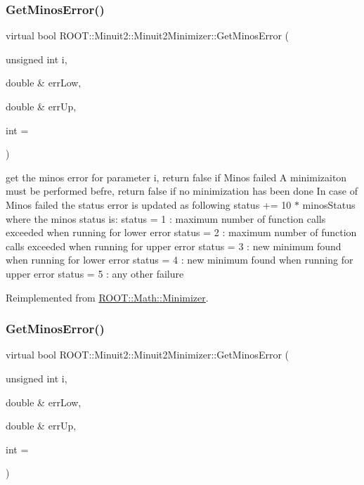 \subsubsection{\texorpdfstring{GetMinosError()}{GetMinosError()}\hspace{0.1cm}{\footnotesize\ttfamily [1/2]}}
{\footnotesize\ttfamily virtual bool R\+O\+O\+T\+::\+Minuit2\+::\+Minuit2\+Minimizer\+::\+Get\+Minos\+Error (\begin{DoxyParamCaption}\item[{unsigned int}]{i,  }\item[{double \&}]{err\+Low,  }\item[{double \&}]{err\+Up,  }\item[{int}]{ = {} }\end{DoxyParamCaption})\hspace{0.3cm}{\ttfamily [virtual]}}

get the minos error for parameter i, return false if Minos failed A minimizaiton must be performed befre, return false if no minimization has been done In case of Minos failed the status error is updated as following status += 10 $\ast$ minos\+Status where the minos status is\+: status = 1 \+: maximum number of function calls exceeded when running for lower error status = 2 \+: maximum number of function calls exceeded when running for upper error status = 3 \+: new minimum found when running for lower error status = 4 \+: new minimum found when running for upper error status = 5 \+: any other failure 

Reimplemented from \mbox{\hyperlink{classROOT_1_1Math_1_1Minimizer_aeaef75b766eff7088939259c842ab056}{R\+O\+O\+T\+::\+Math\+::\+Minimizer}}.

\mbox{\label{classROOT_1_1Minuit2_1_1Minuit2Minimizer_ab6c27c6f165821774dd304561e8956f5}} 
\subsubsection{\texorpdfstring{GetMinosError()}{GetMinosError()}\hspace{0.1cm}{\footnotesize\ttfamily [2/2]}}
{\footnotesize\ttfamily virtual bool R\+O\+O\+T\+::\+Minuit2\+::\+Minuit2\+Minimizer\+::\+Get\+Minos\+Error (\begin{DoxyParamCaption}\item[{unsigned int}]{i,  }\item[{double \&}]{err\+Low,  }\item[{double \&}]{err\+Up,  }\item[{int}]{ = {} }\end{DoxyParamCaption})\hspace{0.3cm}{\ttfamily [virtual]}}

